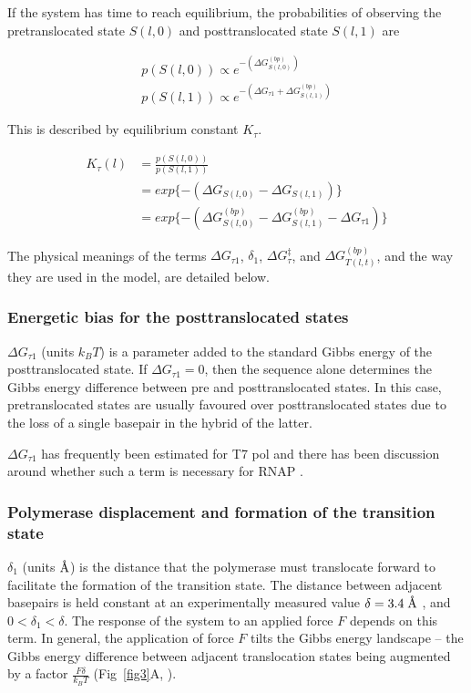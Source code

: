 \documentclass[10pt,letterpaper]{article}
\newcommand{\angstrom}{\mbox{\normalfont\AA}}
\begin{document}
If the system has time to reach equilibrium, the probabilities of observing the pretranslocated state $S(l,0)$ and posttranslocated state $S(l,1)$ are


\begin{eqnarray}
\label{eq:DGpost}
p(S(l,0)) \propto e^{-(\Delta G^{(bp)}_{S(l,0)})} \\
p(S(l,1)) \propto e^{-(\Delta G_{\tau 1} + \Delta G^{(bp)}_{S(l,1)})}
\end{eqnarray}



This is described by equilibrium constant $K_\tau$.

\begin{align}
\label{eq:DGpostEquilibrium}
K_\tau(l) &= \frac{p(S(l,0))}{p(S(l,1))} \\
&= exp\{ -(\Delta G_{S(l,0)} -  \Delta G_{S(l,1)} ) \} \\
 &= exp\{ -(\Delta G^{(bp)}_{S(l,0)} -  \Delta G^{(bp)}_{S(l,1)} - \Delta G _{\tau 1} ) \}
\end{align}



The physical meanings of the terms $\Delta G_{\tau 1}$, $\delta_1$, $\Delta G^\ddag_{\tau}$, and $\Delta G_{T(l,t)}^{(bp)}$, and the way they are used in the model, are detailed below.


\subsubsection*{Energetic bias for the posttranslocated states}
$\Delta G_{\tau 1}$ (units $k_BT$) is a parameter added to the standard Gibbs energy of the posttranslocated state. If $\Delta G_{\tau 1} = 0$, then the sequence alone determines the Gibbs energy difference between pre and posttranslocated states. In this case, pretranslocated states are usually favoured over posttranslocated states due to the loss of a single basepair in the hybrid of the latter.


$\Delta G_{\tau 1}$ has frequently been estimated for T7 pol \cite{yin2004structural, yu2012small, thomen2005unravelling} and there has been discussion around whether such a term is necessary for RNAP \cite{bai2007mechanochemical}. \\

\subsubsection*{Polymerase displacement and formation of the transition state}
$\delta_1$ (units $\angstrom$) is the distance that the polymerase must translocate forward to facilitate the formation of the transition state. The distance between adjacent basepairs is held constant at an experimentally measured value $\delta = 3.4\; \angstrom$ \cite{watson1953molecular}, and   $0 <\delta_1 < \delta$. The response of the system to an applied force $F$ depends on this term. In general, the application of force $F$ tilts the Gibbs energy landscape -- the Gibbs energy difference between adjacent translocation states being augmented by a factor $\frac{F\delta}{k_BT}$ (Fig~\ref{fig3}A, \cite{depken2009origin, herbert2008single}).
\end{document}
